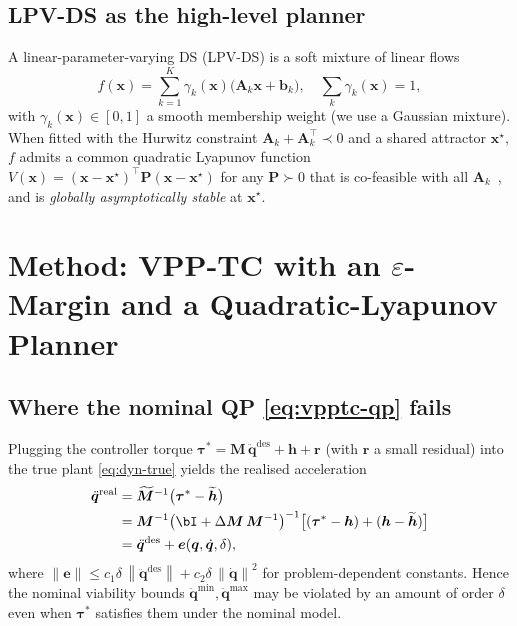 \documentclass[10pt,conference]{IEEEtran}
\newcommand{\bx}{\bm{x}}
\newcommand{\bq}{\bm{q}}
\newcommand{\bdq}{\dot{\bm{q}}}
\newcommand{\bddq}{\ddot{\bm{q}}}
\newcommand{\btau}{\bm{\tau}}
\newcommand{\bM}{\bm{M}}
\newcommand{\bMt}{\widetilde{\bm{M}}}
\newcommand{\bh}{\bm{h}}
\newcommand{\bht}{\widetilde{\bm{h}}}
\newcommand{\bA}{\bm{A}}
\newcommand{\bP}{\bm{P}}
\newcommand{\norm}[1]{\left\lVert #1 \right\rVert}
\theoremstyle{remark}
\theoremstyle{plain}
\begin{document}
\subsection{LPV-DS as the high-level planner}
A linear-parameter-varying DS (LPV-DS) is a soft mixture of
linear flows
\begin{equation}
    f(\bx) = \sum_{k=1}^K \gamma_k(\bx)\bigl(\bA_k\bx + \bm{b}_k\bigr),
    \quad \sum_k \gamma_k(\bx)=1,
    \label{eq:lpvds}
\end{equation}
with $\gamma_k(\bx)\in[0,1]$ a smooth membership weight (we use a
Gaussian mixture). When fitted with the
Hurwitz constraint $\bA_k+\bA_k^\top\prec 0$ and a shared
attractor $\bx^\star$, $f$ admits a common quadratic Lyapunov
function $V(\bx)=(\bx-\bx^\star)^\top \bP (\bx-\bx^\star)$ for any
$\bP\succ 0$ that is co-feasible with all $\bA_k$~\cite{figueroa2018lpvds},
and is \emph{globally asymptotically stable} at $\bx^\star$.

\section{Method: VPP-TC with an $\varepsilon$-Margin and a
Quadratic-Lyapunov Planner}
\label{sec:method}

\subsection{Where the nominal QP \eqref{eq:vpptc-qp} fails}
Plugging the controller torque
$\btau^* = \bM\,\bddq^{\text{des}} + \bh + \bm{r}$ (with
$\bm{r}$ a small residual) into the true plant
\eqref{eq:dyn-true} yields the realised acceleration
\begin{align}
    \bddq^{\text{real}}
        &= \bMt^{-1}\bigl(\btau^* - \bht\bigr) \notag \\
        &= \bM^{-1}\bigl(\bI + \Delta\bM\,\bM^{-1}\bigr)^{-1}
            \bigl[(\btau^* - \bh) + (\bh-\bht)\bigr] \notag \\
        &= \bddq^{\text{des}} + \bm{e}(\bq,\bdq,\delta),
\end{align}
where $\norm{\bm{e}} \le c_1\delta\,\norm{\bddq^{\text{des}}}
+ c_2\delta\,\norm{\bdq}^2$ for problem-dependent
constants. Hence the nominal viability bounds
$\bddq^{\min},\bddq^{\max}$ may be violated by an amount of
order $\delta$ even when $\btau^*$ satisfies them under the
nominal model.
\end{document}
